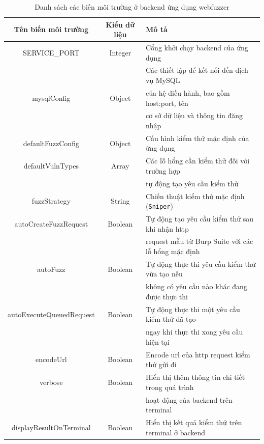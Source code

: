 \begin{table}[ht]
    \centering
    \caption{Danh sách các biến môi trường ở backend ứng dụng webfuzzer}
    \label{tab:env-variables-backend}
    \begin{tabular}[ht]{ccl}
        \toprule[1pt]\midrule[0.3pt]
            \textbf{Tên biến môi trường}&\textbf{Kiểu dữ liệu}&\textbf{Mô tả}\\ 
        \midrule
            SERVICE\_PORT&Integer&Cổng khởi chạy backend của ứng dụng\\
            \addlinespace
            {}&{}&Các thiết lập để kết nối đến dịch vụ MySQL\\
            mysqlConfig&Object&của hệ điều hành, bao gồm host:port, tên\\
            {}&{}&cơ sở dữ liệu và thông tin đăng nhập\\
            \addlinespace
            defaultFuzzConfig&Object&Cấu hình kiểm thử mặc định của ứng dụng\\
            \addlinespace
            defaultVulnTypes&Array&Các lỗ hổng cần kiểm thử đối với trường hợp\\
            {}&{}&tự động tạo yêu cầu kiểm thử\\
            \addlinespace
            fuzzStrategy&String&Chiến thuật kiểm thử mặc định (\texttt{Sniper})\\
            \addlinespace
            autoCreateFuzzRequest&Boolean&Tự động tạo yêu cầu kiểm thử sau khi nhận \acrshort{http}\\
            {}&{}&request mẫu từ Burp Suite với các lỗ hổng mặc định\\
            \addlinespace
            autoFuzz&Boolean&Tự động thực thi yêu cầu kiểm thử vừa tạo nếu\\
            {}&{}&không có yêu cầu nào khác đang được thực thi\\
            \addlinespace
            autoExecuteQueuedRequest&Boolean&Tự động thực thi một yêu cầu kiểm thử đã tạo\\
            {}&{}&ngay khi thực thi xong yêu cầu hiện tại\\
            \addlinespace
            encodeUrl&Boolean&Encode \acrshort{url} của \acrshort{http} request kiểm thử gửi đi\\
            \addlinespace
            verbose&Boolean&Hiển thị thêm thông tin chi tiết trong quá trình\\
            {}&{}&hoạt động của backend trên terminal\\
            \addlinespace
            displayResultOnTerminal&Boolean&Hiển thị kết quả kiểm thử trên terminal ở backend\\
        \midrule[0.3pt]\bottomrule[1pt]
    \end{tabular}
\end{table}
\FloatBarrier
